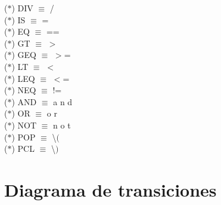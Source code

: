 \documentclass[\main/MemoriaPL.tex]{subfiles}
\begin{document}
    \vspace{2mm}
    \hspace{5mm}($\ast$) DIV $\equiv$ / \\
    \vspace{2mm}
    \hspace{5mm}($\ast$) IS $\equiv$ = \\
    \vspace{2mm}
    \hspace{5mm}($\ast$) EQ $\equiv$ == \\
    \vspace{2mm}
    \hspace{5mm}($\ast$) GT $\equiv$ $>$ \\
    \vspace{2mm}
    \hspace{5mm}($\ast$) GEQ $\equiv$ $>$= \\
    \vspace{2mm}
    \hspace{5mm}($\ast$) LT $\equiv$ $<$ \\
    \vspace{2mm}
    \hspace{5mm}($\ast$) LEQ $\equiv$ $<$= \\
    \vspace{2mm}
    \hspace{5mm}($\ast$) NEQ $\equiv$ != \\
    \vspace{2mm}
    \hspace{5mm}($\ast$) AND $\equiv$ a n d \\
    \vspace{2mm}
    \hspace{5mm}($\ast$) OR $\equiv$ o r \\
    \vspace{2mm}
    \hspace{5mm}($\ast$) NOT $\equiv$ n o t \\
    \vspace{2mm}
    \hspace{5mm}($\ast$) POP $\equiv$ \textbackslash $($ \\
    \vspace{2mm}
    \hspace{5mm}($\ast$) PCL $\equiv$ \textbackslash $)$

  \section{Diagrama de transiciones} %
\end{document}
